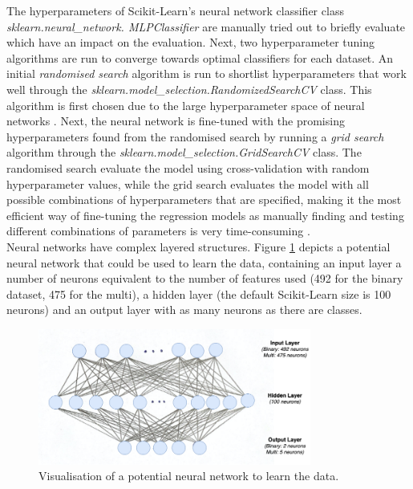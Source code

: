 \documentclass[letterpaper,12pt]{article}
\begin{document}
The hyperparameters of Scikit-Learn’s neural network classifier class \textit{sklearn.neural\_network. MLPClassifier} are manually tried out to briefly evaluate which have an impact on the evaluation. Next, two hyperparameter tuning algorithms are run to converge towards optimal classifiers for each dataset. An initial \textit{randomised search} algorithm is run to shortlist hyperparameters that work well through the \textit{sklearn.model\_selection.RandomizedSearchCV} class. This algorithm is first chosen due to the large hyperparameter space of neural networks \cite{Geron2019}. Next, the neural network is fine-tuned with the promising hyperparameters found from the randomised search by running a \textit{grid search} algorithm through the \textit{sklearn.model\_selection.GridSearchCV} class. The randomised search evaluate the model using cross-validation with random hyperparameter values, while the grid search evaluates the model with all possible combinations of hyperparameters that are specified, making it the most efficient way of fine-tuning the regression models as manually finding and testing different combinations of parameters is very time-consuming \cite{Geron2019}.\\

Neural networks have complex layered structures. Figure \ref{fig:neural_network} depicts a potential neural network that could be used to learn the data, containing an input layer a number of neurons equivalent to the number of features used (492 for the binary dataset, 475 for the multi), a hidden layer (the default Scikit-Learn size is 100 neurons) and an output layer with as many neurons as there are classes.

\begin{figure}[h]
\centerline{\includegraphics[width=0.8\textwidth]{report/figures/neural_network.png}}
\caption{\label{fig:neural_network}Visualisation of a potential neural network to learn the data.}
\end{figure}
\end{document}
